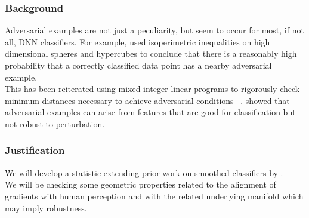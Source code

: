

\begin{frame}
  \frametitle{Background}

 Adversarial examples are not just a peculiarity, but seem to occur
 for most, if not all, DNN classifiers. For example,
 \citet{inevitable2018} used isoperimetric inequalities on high
 dimensional spheres and hypercubes to conclude that there is a
 reasonably high probability that a correctly classified data point
 has a nearby adversarial example.\\

 This has been reiterated using mixed integer linear programs to rigorously check minimum distances necessary to achieve adversarial conditions ~\citep{tjeng2017evaluating}. \citet{ilyas2019adversarial} showed that adversarial examples can arise from features that are good for classification but not robust to perturbation. 
\end{frame}
  

\begin{frame}
  \frametitle{Justification}
  We will develop a statistic extending
 prior work on smoothed classifiers by \citet{cohen2019certified}. \\

We will be checking some geometric properties related to the alignment of gradients
  with human perception \citep{ganz2022perceptually,
    kaur2019perceptually, shah2021input} and with the related
  underlying manifold \citep{kaur2019perceptually,
    ilyas2019adversarial} which may imply robustness.\\

\end{frame}

